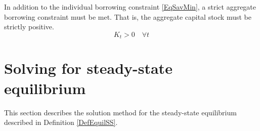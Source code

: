 \documentclass[letterpaper,12pt]{article}
\theoremstyle{definition}
\begin{document}
  In addition to the individual borrowing constraint \eqref{EqSavMin}, a strict aggregate borrowing constraint must be met. That is, the aggregate capital stock must be strictly positive.
  \begin{equation}\label{EqAggrCapConstr}
    K_t > 0 \quad\forall t
  \end{equation}


\newpage
\section{Solving for steady-state equilibrium}\label{AppSSsolve}

  \setcounter{equation}{0}

  This section describes the solution method for the steady-state equilibrium described in Definition \ref{DefEquilSS}.
\end{document}
